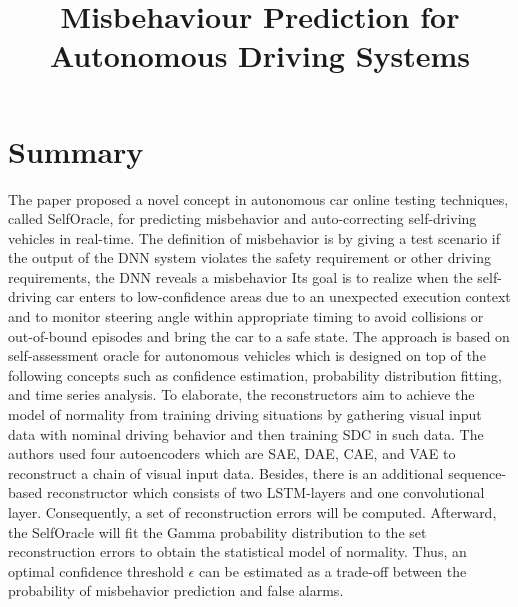 \documentclass[10pt,a4paper]{report}
\title{Misbehaviour Prediction for Autonomous Driving Systems}
\begin{document}
\begin{center}
\textbf{\thetitle}
\end{center}


\section{Summary}
The paper proposed a novel concept in autonomous car online testing techniques, called SelfOracle, for predicting misbehavior and auto-correcting self-driving vehicles in real-time.
%
The definition of misbehavior is by giving a test scenario if the output of the DNN system violates the safety requirement or other driving requirements, the DNN reveals a misbehavior
%
Its goal is to realize when the self-driving car enters to low-confidence areas due to an unexpected execution context and to monitor steering angle within appropriate timing to avoid collisions or out-of-bound episodes and bring the car to a safe state.
%
The approach is based on self-assessment oracle for autonomous vehicles which is designed on top of the following concepts such as confidence estimation, probability distribution fitting, and time series analysis.
%
To elaborate, the reconstructors aim to achieve the model of normality from training driving situations by gathering visual input data with nominal driving behavior and then training SDC in such data. 
%
The authors used four autoencoders which are SAE, DAE, CAE, and VAE to reconstruct a chain of visual input data.
%
Besides, there is an additional sequence-based reconstructor which consists of two LSTM-layers and one convolutional layer.
%
Consequently, a set of reconstruction errors will be computed.
% 
Afterward, the SelfOracle will fit the Gamma probability distribution to the set reconstruction errors to obtain the statistical model of normality. 
%
Thus, an optimal confidence threshold $\epsilon$ can be estimated as a trade-off between the probability of misbehavior prediction and false alarms.
\end{document}
